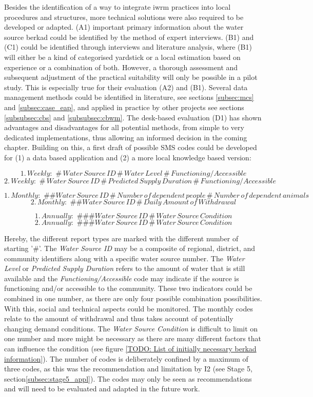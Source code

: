 Besides the identification of a way to integrate \acrshort{iwrm} practices into local procedures and structures, more technical solutions were also required to be developed or adapted. (A1) important primary information about the water source berkad could be identified by the method of expert interviews. (B1) and (C1) could be identified through interviews and literature analysis, where (B1) will either be a kind of categorised yardstick or a local estimation based on experience or a combination of both. However, a thorough assessment and subsequent adjustment of the practical suitability will only be possible in a pilot study. This is especially true for their evaluation (A2) and (B1). Several data management methods could be identified in literature, see sections \ref*{subsec:mcs} and \ref{subsec:case_eap}, and applied in practice by other projects see sections \ref*{subsubsec:cbs} and \ref*{subsubsec:cbwm}. The desk-based evaluation (D1) has shown advantages and disadvantages for all potential methods, from simple to very dedicated implementations, thus allowing an informed decision in the coming chapter. Building on this, a first draft of possible SMS codes could be developed for (1) a data based application and (2) a more local knowledge based version:

\[1.\, Weekly:\,\,\#\, Water\, Source\, ID\, \#\, Water\, Level\, \#\, Functioning/Accessible\]
\[2.\, Weekly:\,\,\#\, Water\, Source\, ID\, \#\, Predicted\, Supply\, Duration\, \#\, Functioning/Accessible\]

\[1.\, Monthly:\,\, \#\# Water\, Source\, ID\, \#\, Number\, of\, dependent\, people\, \#\, Number\, of\, dependent\, animals\]
\[2.\, Monthly:\,\, \#\# Water\, Source\, ID\, \#\, Daily\, Amount\, of\, Withdrawal\]

\[1.\, Annually:\,\, \#\#\# Water\, Source\, ID\, \#\, Water\, Source\, Condition\]
\[2.\, Annually:\,\, \#\#\# Water\, Source\, ID\, \#\, Water\, Source\, Condition\]

Hereby, the different report types are marked with the different number of starting '#'. The \textit{Water Source ID} may be a composite of regional, district, and community identifiers along with a specific water source number. The \textit{Water Level} or \textit{Predicted Supply Duration} refers to the amount of water that is still available and the \textit{Functioning/Accessible} code may indicate if the source is functioning and/or accessible to the community. These two indicators could be combined in one number, as there are only four possible combination possibilities. With this, social and technical aspects could be monitored. The monthly codes relate to the amount of withdrawal and thus takes account of potentially changing demand conditions. The \textit{Water Source Condition} is difficult to limit on one number and more might be necessary as there are many different factors that can influence the condition (see figure \ref{TODO: List of initially necessary berkad information}). The number of codes is deliberately confined by a maximum of three codes, as this was the recommendation and limitation by I2 (see Stage 5, section\ref{subsec:stage5_appl}). The codes may only be seen as  recommendations and will need to be evaluated and adapted in the future work.

